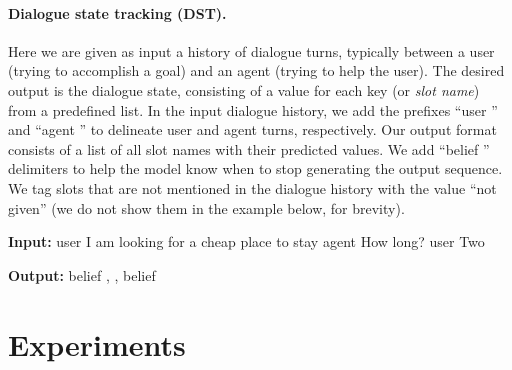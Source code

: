 \paragraph{Dialogue state tracking (DST).}
Here we are given as input a history of dialogue turns,
typically between a user (trying to accomplish a goal) and an agent (trying to help the user).
The desired output is the dialogue state, consisting of a value for each key (or \emph{slot name}) from a predefined list.
In the input dialogue history, we add the prefixes ``\entitybegin user \entityend\taskseparator'' and ``\entitybegin agent \entityend\taskseparator'' to delineate user and agent turns, respectively.
Our output format consists of a list of all slot names with their predicted values.
We add ``\entitybegin belief \entityend'' delimiters to help the model know when to stop generating the output sequence.
We tag slots that are not mentioned in the dialogue history with the value ``not given'' (we do not show them in the example below, for brevity).

\begin{footnotesize}
\begin{customquote}
\quotespacestart
    \textbf{Input:}
    \nohyphens{\entitybegin user \entityend\taskseparator I am looking for a cheap place to stay \entitybegin agent \entityend\taskseparator How long? } \entitybegin user \entityend\taskseparator Two
    
    \textbf{Output:}
    \nohyphens{\entitybegin belief \entityend {} ,  ,   \entitybegin belief \entityend}
    \quotespaceend
\end{customquote}
\end{footnotesize}

\section{Experiments}
\label{sec:experiments}

